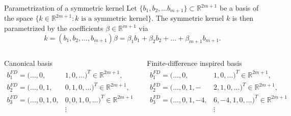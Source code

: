 \begin{frame}{Parametrization of a symmetric kernel}
  Let $\{b_1, b_2, \dots b_{m+1} \} \subset \mathbb{R}^{2m+1}$ be a basis of the space 
  $\{ k \in \mathbb{R}^{2m+1} : k \text{ is a symmetric kernel} \}$.
  The symmetric kernel $k$ is then parametrized by the coefficients $\beta \in \mathbb{R}^{m+1}$ via
  \begin{equation*}
    k = (b_1, b_2, \dots, b_{m+1}) \beta = \beta_1 b_1 + \beta_2 b_2 + \dots + \beta_{m+1} b_{m+1}
    .
  \end{equation*}

  \vspace{0.3cm}
  \begin{columns}
    \centering
    Canonical basis
    \begin{align*}
      b_1^{FD} = (\dots, 0,& 1,0, \dots)^T \in \mathbb{R}^{2m+1},\\
      b_2^{FD} = (\dots, 0, 1,&0,1, 0, \dots)^T \in \mathbb{R}^{2m+1},\\
      b_3^{FD} = (\dots, 0, 1,0,& 0,0,1, 0, \dots)^T \in \mathbb{R}^{2m+1} \\
      &\vdots
    \end{align*}

    \centering
    Finite-difference inspired basis
    \begin{align*}
      b_1^{FD} = (\dots, 0,& 1,0, \dots)^T \in \mathbb{R}^{2m+1},\\
      b_2^{FD} = (\dots, 0, 1,-&2,1, 0, \dots)^T \in \mathbb{R}^{2m+1},\\
      b_3^{FD} = (\dots, 0, 1,-4,& 6,-4,1, 0, \dots)^T \in \mathbb{R}^{2m+1} \\
      &\vdots
    \end{align*}
  \end{columns}
\end{frame}

